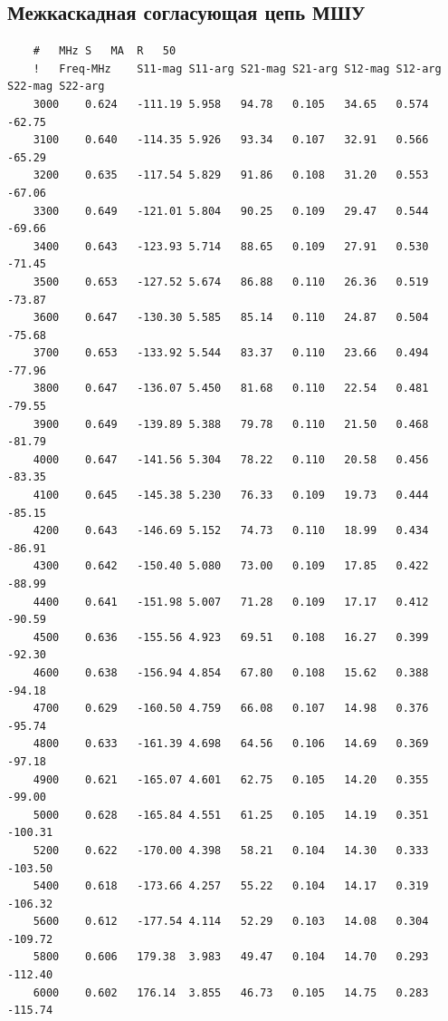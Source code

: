 \documentclass[utf8x, 14pt, oneside, a4paper]{article}
\begin{document}
	\subsection*{Межкаскадная согласующая цепь МШУ}
	\begin{lstlisting}
	#	MHz	S	MA	R	50										
	!	Freq-MHz	S11-mag	S11-arg	S21-mag	S21-arg	S12-mag	S12-arg	S22-mag	S22-arg						
	3000	0.624	-111.19	5.958	94.78	0.105	34.65	0.574	-62.75
	3100	0.640	-114.35	5.926	93.34	0.107	32.91	0.566	-65.29
	3200	0.635	-117.54	5.829	91.86	0.108	31.20	0.553	-67.06
	3300	0.649	-121.01	5.804	90.25	0.109	29.47	0.544	-69.66
	3400	0.643	-123.93	5.714	88.65	0.109	27.91	0.530	-71.45
	3500	0.653	-127.52	5.674	86.88	0.110	26.36	0.519	-73.87
	3600	0.647	-130.30	5.585	85.14	0.110	24.87	0.504	-75.68
	3700	0.653	-133.92	5.544	83.37	0.110	23.66	0.494	-77.96
	3800	0.647	-136.07	5.450	81.68	0.110	22.54	0.481	-79.55
	3900	0.649	-139.89	5.388	79.78	0.110	21.50	0.468	-81.79
	4000	0.647	-141.56	5.304	78.22	0.110	20.58	0.456	-83.35
	4100	0.645	-145.38	5.230	76.33	0.109	19.73	0.444	-85.15
	4200	0.643	-146.69	5.152	74.73	0.110	18.99	0.434	-86.91
	4300	0.642	-150.40	5.080	73.00	0.109	17.85	0.422	-88.99
	4400	0.641	-151.98	5.007	71.28	0.109	17.17	0.412	-90.59
	4500	0.636	-155.56	4.923	69.51	0.108	16.27	0.399	-92.30
	4600	0.638	-156.94	4.854	67.80	0.108	15.62	0.388	-94.18
	4700	0.629	-160.50	4.759	66.08	0.107	14.98	0.376	-95.74
	4800	0.633	-161.39	4.698	64.56	0.106	14.69	0.369	-97.18
	4900	0.621	-165.07	4.601	62.75	0.105	14.20	0.355	-99.00
	5000	0.628	-165.84	4.551	61.25	0.105	14.19	0.351	-100.31
	5200	0.622	-170.00	4.398	58.21	0.104	14.30	0.333	-103.50
	5400	0.618	-173.66	4.257	55.22	0.104	14.17	0.319	-106.32
	5600	0.612	-177.54	4.114	52.29	0.103	14.08	0.304	-109.72
	5800	0.606	179.38	3.983	49.47	0.104	14.70	0.293	-112.40
	6000	0.602	176.14	3.855	46.73	0.105	14.75	0.283	-115.74
	\end{lstlisting}
	\pagebreak
	
	
\end{document}
